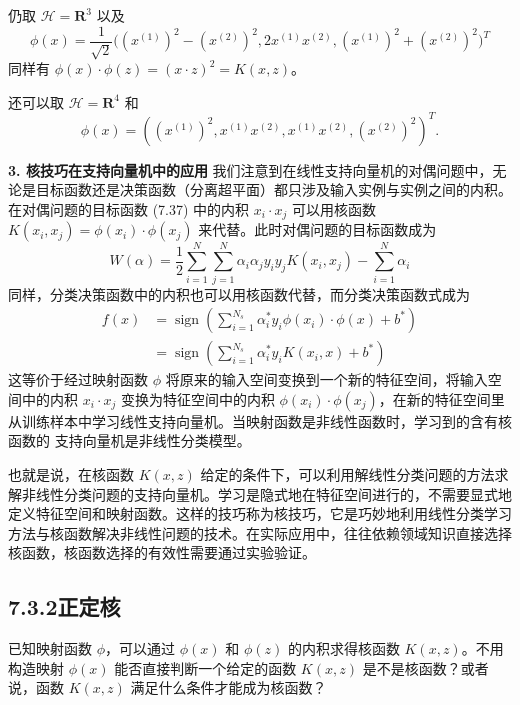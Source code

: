 \documentclass[UTF8,12pt,a4paper,fontset=fandol]{ctexart}
\begin{document}
仍取 $\mathcal{H}=\mathbf{R}^3$ 以及
\[
\phi(x)=\frac{1}{\sqrt{2}}\bigl((x^{(1)})^2-(x^{(2)})^2,2x^{(1)}x^{(2)},(x^{(1)})^2+(x^{(2)})^2\bigr)^T
\]
同样有 $\phi(x)\cdot\phi(z)=(x\cdot z)^2=K(x,z)$。

还可以取 $\mathcal{H}=\mathbf{R}^4$ 和
\[
\phi(x)=((x^{(1)})^2,x^{(1)}x^{(2)},x^{(1)}x^{(2)},(x^{(2)})^2)^T.
\]

\noindent\textbf{3. 核技巧在支持向量机中的应用}\quad
我们注意到在线性支持向量机的对偶问题中，无论是目标函数还是决策函数（分离超平面）都只涉及输入实例与实例之间的内积。在对偶问题的目标函数 (7.37) 中的内积 $x_i\cdot x_j$ 可以用核函数 $K(x_i,x_j)=\phi(x_i)\cdot\phi(x_j)$ 来代替。此时对偶问题的目标函数成为
\begin{equation}
W(\alpha)=\frac{1}{2}\sum_{i=1}^N\sum_{j=1}^N\alpha_i\alpha_j y_i y_j K(x_i,x_j)-\sum_{i=1}^N\alpha_i
\tag{7.67}
\end{equation}
同样，分类决策函数中的内积也可以用核函数代替，而分类决策函数式成为
\begin{equation}
\begin{aligned}
f(x)&=\operatorname{sign}\left(\sum_{i=1}^{N_s}\alpha_i^*y_i\phi(x_i)\cdot\phi(x)+b^*\right)\\
&=\operatorname{sign}\left(\sum_{i=1}^{N_s}\alpha_i^*y_i K(x_i,x)+b^*\right)
\end{aligned}
\tag{7.68}
\end{equation}
这等价于经过映射函数 $\phi$ 将原来的输入空间变换到一个新的特征空间，将输入空间中的内积 $x_i\cdot x_j$ 变换为特征空间中的内积 $\phi(x_i)\cdot\phi(x_j)$，在新的特征空间里从训练样本中学习线性支持向量机。当映射函数是非线性函数时，学习到的含有核函数的
支持向量机是非线性分类模型。

也就是说，在核函数 $K(x,z)$ 给定的条件下，可以利用解线性分类问题的方法求解非线性分类问题的支持向量机。学习是隐式地在特征空间进行的，不需要显式地定义特征空间和映射函数。这样的技巧称为核技巧，它是巧妙地利用线性分类学习方法与核函数解决非线性问题的技术。在实际应用中，往往依赖领域知识直接选择核函数，核函数选择的有效性需要通过实验验证。

\subsection*{7.3.2\quad 正定核}

已知映射函数 $\phi$，可以通过 $\phi(x)$ 和 $\phi(z)$ 的内积求得核函数 $K(x,z)$。不用构造映射 $\phi(x)$ 能否直接判断一个给定的函数 $K(x,z)$ 是不是核函数？或者说，函数 $K(x,z)$ 满足什么条件才能成为核函数？
\end{document}
